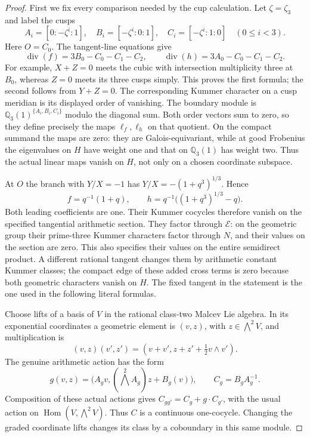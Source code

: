 \begin{proof}
First we fix every comparison needed by the cup
calculation. Let $\zeta=\zeta_3$ and label the cusps
\[
 A_i=[0:-\zeta^i:1],\quad
 B_i=[-\zeta^i:0:1],\quad
 C_i=[-\zeta^i:1:0]\quad(0\le i<3).
\]
Here $O=C_0$. The tangent-line equations give
\[
 \operatorname{div}(f)=3B_0-C_0-C_1-C_2,
 \qquad
 \operatorname{div}(h)=3A_0-C_0-C_1-C_2.
 \tag{E.35.6}
\]
For example, $X+Z=0$ meets the cubic with
intersection multiplicity three at $B_0$, whereas
$Z=0$ meets its three cusps simply. This proves
the first formula; the second follows from
$Y+Z=0$. The corresponding Kummer character on
a cusp meridian is its displayed order of
vanishing. The boundary module is
$\mathbb Q_3(1)^{\{A_i,B_i,C_i\}}$ modulo the
diagonal sum. Both order vectors sum to zero,
so they define precisely the maps $\ell_f,\ell_h$
on that quotient. On the compact summand the
maps are zero: they are Galois-equivariant, while
at good Frobenius the eigenvalues on $H$ have
weight one and that on $\mathbb Q_3(1)$ has
weight two. Thus the actual linear maps vanish
on $H$, not only on a chosen coordinate subspace.

At $O$ the branch with $Y/X=-1$ has
$Y/X=-(1+q^3)^{1/3}$. Hence
\[
 f=q^{-1}(1+q),\qquad
 h=q^{-1}\bigl((1+q^3)^{1/3}-q\bigr).
 \tag{E.35.7}
\]
Both leading coefficients are one. Their
Kummer cocycles therefore vanish on the specified
tangential arithmetic section. They factor through
$\mathcal E$: on the geometric group their
prime-three Kummer characters factor through $N$,
and their values on the section are zero. This
also specifies their values on the entire
semidirect product. A different rational tangent
changes them by arithmetic constant Kummer
classes; the compact edge of these added cross
terms is zero because both geometric characters
vanish on $H$. The fixed tangent in the statement
is the one used in the following literal formulas.

Choose lifts of a basis of $V$ in the rational
class-two Malcev Lie algebra. In its exponential
coordinates a geometric element is $(v,z)$,
with $z\in\bigwedge^2V$, and multiplication is
\[
 (v,z)(v',z')=
       (v+v',z+z'+\tfrac12v\wedge v').
 \tag{E.35.8}
\]
The genuine arithmetic action has the form
\[
 g(v,z)=\bigl(A_gv,
          (\bigwedge^2A_g)z+B_g(v)\bigr),
 \qquad C_g=B_gA_g^{-1}.
 \tag{E.35.9}
\]
Composition of these actual actions gives
$C_{gg'}=C_g+g\cdot C_{g'}$, with the usual
action on $\operatorname{Hom}(V,\bigwedge^2V)$.
Thus $C$ is a continuous one-cocycle. Changing
the graded coordinate lifts changes its class by
a coboundary in this same module.


\end{proof}
